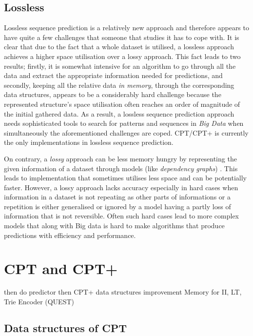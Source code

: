 \subsection*{Lossless}\label{losslessVSlossy}
Lossless sequence prediction is a relatively new approach and therefore appears to have quite a few challenges that someone that studies it has to cope with. It is clear that due to the fact that a whole dataset is utilised, a lossless approach achieves a higher space utilisation over a lossy approach. This fact leads to two results; firstly, it is somewhat intensive for an algorithm to go through all the data and extract the appropriate information needed for predictions, and secondly, keeping all the relative data \emph{in memory}, through the corresponding data structures, appears to be a considerably hard challenge because the represented structure's space utilisation often reaches an order of magnitude of the initial gathered data. As a result, a lossless sequence prediction approach needs sophisticated tools to search for patterns and sequences in \emph{Big Data} when simultaneously the aforementioned challenges are coped. CPT/CPT+ is currently the only implementations in lossless sequence prediction. 
\par On contrary, a \emph{lossy} approach can be less memory hungry by representing the given information of a dataset through models (like \emph{dependency graphs}) \cite{Padmanabhan:1996:UPP:235160.235164}. This leads to implementation that sometimes utilises less space and can be potentially faster. However, a lossy approach lacks accuracy especially in hard cases when information in a dataset is not repeating as other parts of informations or a repetition is either generalised or ignored by a model having a partly loss of information that is not reversible. Often such hard cases lead to more complex models that along with Big data is hard to make algorithms that produce predictions with efficiency and performance.

\section{CPT and CPT+}\label{CPT}
then do predictor
then CPT+ data structures improvement
Memory for II, LT, Trie Encoder (QUEST)

\subsection{Data structures of CPT}

